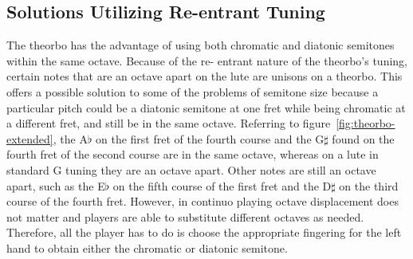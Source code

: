 \subsection{Solutions Utilizing Re-entrant Tuning}

The theorbo has the advantage of using both chromatic and diatonic semitones within the same octave. Because of the re-
entrant nature of the theorbo's tuning, certain notes that are an octave apart on the lute are unisons on a theorbo.
This offers a possible solution to some of the problems of semitone size because a particular pitch could be a diatonic
semitone at one fret while being chromatic at a different fret, and still be in the same octave. Referring to
figure~\ref{fig:theorbo-extended}, the A$\flat$ on the first fret of the fourth course and the G$\sharp$ found on the
fourth fret of the second course are in the same octave, whereas on a lute in standard G tuning they are an octave
apart. Other notes are still an octave apart, such as the E$\flat$ on the fifth course of the first fret and the
D$\sharp$ on the third course of the fourth fret. However, in continuo playing octave displacement does not matter and
players are able to substitute different octaves as needed. Therefore, all the player has to do is choose the
appropriate fingering for the left hand to obtain either the chromatic or diatonic semitone.

